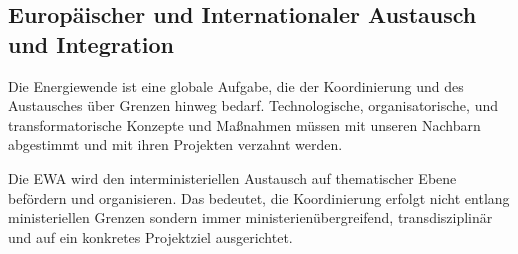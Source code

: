 
\subsection{Europäischer und Internationaler Austausch und Integration}

Die Energiewende ist eine globale Aufgabe, die der Koordinierung und des Austausches über Grenzen hinweg bedarf.
Technologische, organisatorische, und transformatorische Konzepte und Maßnahmen müssen mit unseren Nachbarn abgestimmt und mit ihren Projekten verzahnt werden.

Die EWA wird den interministeriellen Austausch auf thematischer Ebene befördern und organisieren. 
Das bedeutet, die Koordinierung erfolgt nicht entlang ministeriellen Grenzen sondern immer ministerienübergreifend, transdisziplinär und auf ein konkretes Projektziel ausgerichtet.

